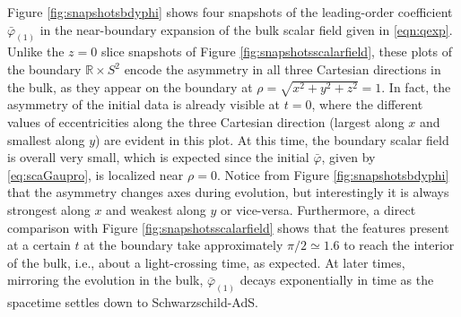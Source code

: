 \documentclass[a4paper,11pt]{article}
\numberwithin{equation}{section}
\begin{document}
Figure \ref{fig:snapshotsbdyphi} shows four snapshots of the leading-order coefficient $\bar{\varphi}_{(1)}$ in the near-boundary expansion of the bulk scalar field given in \eqref{eqn:qexp}.
Unlike the $z=0$ slice snapshots of Figure \ref{fig:snapshotsscalarfield}, these plots of the boundary $\mathbb{R}\times S^2$ encode the asymmetry in all three Cartesian directions in the bulk, as they appear on the boundary at $\rho = \sqrt{x^2+y^2+z^2}=1$. 
In fact, the asymmetry of the initial data is already visible at $t=0$, where the different values of eccentricities along the three Cartesian direction (largest along $x$ and smallest along $y$) are evident in this plot. At this time, the boundary scalar field is overall very small, which is expected since the initial $\bar{\varphi}$, given by \eqref{eq:scaGaupro}, is localized near $\rho=0$.
Notice from Figure \ref{fig:snapshotsbdyphi} that the asymmetry changes axes during evolution, but interestingly it is always strongest along $x$ and weakest along $y$ or vice-versa. Furthermore, a direct comparison with Figure \ref{fig:snapshotsscalarfield} shows that the features present at a certain $t$ at the boundary take approximately $\pi/2\simeq1.6$ to reach the interior of the bulk, i.e., about a light-crossing time, as expected. At later times, mirroring the evolution in the bulk, $\bar{\varphi}_{(1)}$ decays exponentially in time as the spacetime settles down to Schwarzschild-AdS.
\end{document}
